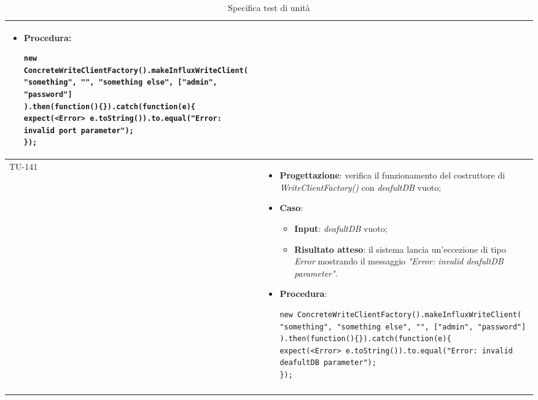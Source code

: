 \begin{longtable}{|C{1.5cm}|C{14.5cm}|}
\begin{itemize}
\begin{itemize}
	\end{itemize}
	\item \textbf{Procedura}:
	\begin{lstlisting}
new ConcreteWriteClientFactory().makeInfluxWriteClient(
"something", "", "something else", ["admin", "password"]
).then(function(){}).catch(function(e){
expect(<Error> e.toString()).to.equal("Error: invalid port parameter");
});
	\end{lstlisting}
\end{itemize}\\
\hline
{TU-141} &
\begin{itemize}
	\item \textbf{Progettazione}: verifica il funzionamento del costruttore di \emph{WriteClientFactory()} con \emph{deafultDB} vuoto;
	\item \textbf{Caso}: 
	\begin{itemize}
		\item \textbf{Input}: \emph{deafultDB} vuoto;
		\item \textbf{Risultato atteso}: il sistema lancia un'eccezione di tipo \emph{Error} mostrando il messaggio \emph{"Error: invalid deafultDB parameter"}.
	\end{itemize}
	\item \textbf{Procedura}:
	\begin{lstlisting}
new ConcreteWriteClientFactory().makeInfluxWriteClient(
"something", "something else", "", ["admin", "password"]
).then(function(){}).catch(function(e){
expect(<Error> e.toString()).to.equal("Error: invalid deafultDB parameter");
});
	\end{lstlisting}
\end{itemize}\\
\hline
	\caption{Specifica test di unità}
	\label{tabella:specifica tu}
\end{longtable}
\renewcommand{\arraystretch}{1}
\newpage


